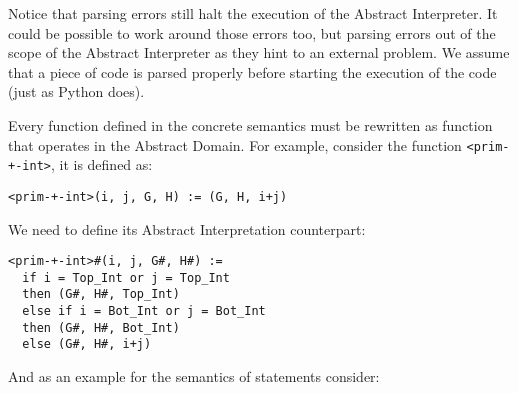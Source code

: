 Notice that parsing errors still halt the execution of the Abstract
Interpreter. It could be possible to work around those errors too, but
parsing errors out of the scope of the Abstract Interpreter as they hint
to an external problem. We assume that a piece of code is parsed
properly before starting the execution of the code (just as Python
does).

Every function defined in the concrete semantics must be rewritten as function that
operates in the Abstract Domain. For example, consider the function \verb|<prim-+-int>|,
it is defined as:

\texttt{\textless{}prim-+-int\textgreater{}(i,\ j,\ G,\ H)\ :=\ (G,\ H,\ i+j)}

We need to define its Abstract Interpretation counterpart:

\begin{verbatim}
<prim-+-int>#(i, j, G#, H#) :=
  if i = Top_Int or j = Top_Int
  then (G#, H#, Top_Int)
  else if i = Bot_Int or j = Bot_Int
  then (G#, H#, Bot_Int)
  else (G#, H#, i+j)
\end{verbatim}

And as an example for the semantics of statements consider:

